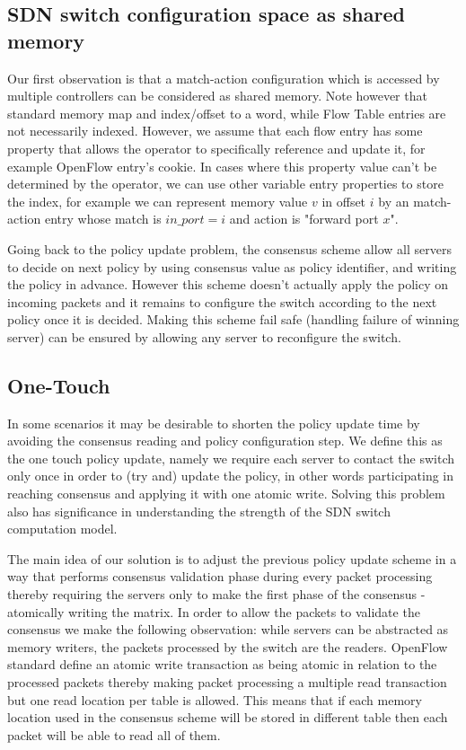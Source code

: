 \documentclass[conference]{sigcomm-alternate}
\begin{document}
\subsection{SDN switch configuration space as shared memory}





Our first observation is that a match-action configuration which is accessed by multiple controllers can be considered as shared memory. Note however that standard memory map and index/offset to a word, while Flow Table entries are not necessarily indexed. However, we assume that each flow entry has some property that allows the operator to specifically reference and update it, for example OpenFlow entry's cookie. In cases where this property value can't be determined by the operator, we can use other variable entry properties to store the index, for example we can represent memory value $v$ in offset $i$ by an match-action entry whose match is $in\_port = i$ and action is "forward port $x$".


Going back to the policy update problem, the consensus scheme allow all servers to decide on next policy by using consensus value as policy identifier, and writing the policy in advance. However this scheme doesn't actually apply the policy on incoming packets and it remains to configure the switch according to the next policy once it is decided. Making this scheme fail safe (handling failure of winning server) can be ensured by allowing any server to reconfigure the switch.

\subsection{ One-Touch}

In some scenarios it may be desirable to shorten the policy update time by avoiding the consensus reading and policy configuration step. We define this as the one touch policy update, namely we require each server to contact the switch only once in order to (try and) update the policy, in other words participating in reaching consensus and applying it with one atomic write. Solving this problem also has significance in understanding the strength of the SDN switch computation model.

The main idea of our solution is to adjust the previous policy update scheme in a way that performs consensus validation phase during every packet processing thereby requiring the servers only to make the first phase of the consensus - atomically writing the matrix.
In order to allow the packets to validate the consensus we make the following observation: while servers can be abstracted as memory writers, the packets processed by the switch are the readers. OpenFlow standard define an atomic write transaction as being atomic in relation to the processed packets thereby making packet processing a multiple read transaction but one read location per table is allowed. This means that if each memory location used in the consensus scheme will be stored in different table then each packet will be able to read all of them.
\end{document}
